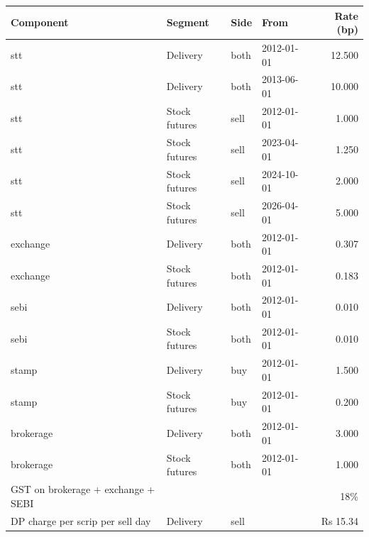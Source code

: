 \begin{tabular}{llllr}\toprule
Component & Segment & Side & From & Rate (bp) \\ \midrule
stt & Delivery & both & 2012-01-01 & 12.500 \\
stt & Delivery & both & 2013-06-01 & 10.000 \\
stt & Stock futures & sell & 2012-01-01 & 1.000 \\
stt & Stock futures & sell & 2023-04-01 & 1.250 \\
stt & Stock futures & sell & 2024-10-01 & 2.000 \\
stt & Stock futures & sell & 2026-04-01 & 5.000 \\
exchange & Delivery & both & 2012-01-01 & 0.307 \\
exchange & Stock futures & both & 2012-01-01 & 0.183 \\
sebi & Delivery & both & 2012-01-01 & 0.010 \\
sebi & Stock futures & both & 2012-01-01 & 0.010 \\
stamp & Delivery & buy & 2012-01-01 & 1.500 \\
stamp & Stock futures & buy & 2012-01-01 & 0.200 \\
brokerage & Delivery & both & 2012-01-01 & 3.000 \\
brokerage & Stock futures & both & 2012-01-01 & 1.000 \\
\midrule
GST on brokerage + exchange + SEBI & & & & 18\% \\
DP charge per scrip per sell day & Delivery & sell & & Rs 15.34 \\
\bottomrule\end{tabular}
